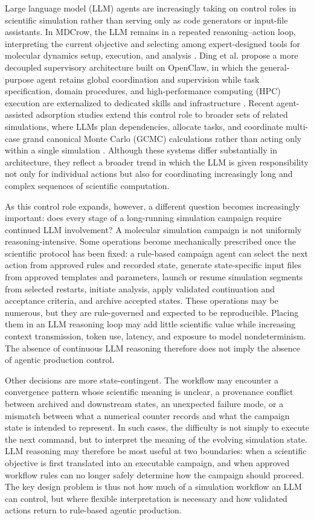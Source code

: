 Large language model (LLM) agents are increasingly taking on control roles in scientific simulation rather than serving only as code generators or input-file assistants. In MDCrow, the LLM remains in a repeated reasoning--action loop, interpreting the current objective and selecting among expert-designed tools for molecular dynamics setup, execution, and analysis \cite{mdcrow}. Ding et al. propose a more decoupled supervisory architecture built on OpenClaw, in which the general-purpose agent retains global coordination and supervision while task specification, domain procedures, and high-performance computing (HPC) execution are externalized to dedicated skills and infrastructure \cite{openclawchem}. Recent agent-assisted adsorption studies extend this control role to broader sets of related simulations, where LLMs plan dependencies, allocate tasks, and coordinate multi-case grand canonical Monte Carlo (GCMC) calculations rather than acting only within a single simulation \cite{simmof,multiagentgcmc}. Although these systems differ substantially in architecture, they reflect a broader trend in which the LLM is given responsibility not only for individual actions but also for coordinating increasingly long and complex sequences of scientific computation.

As this control role expands, however, a different question becomes increasingly important: does every stage of a long-running simulation campaign require continued LLM involvement? A molecular simulation campaign is not uniformly reasoning-intensive. Some operations become mechanically prescribed once the scientific protocol has been fixed: a rule-based campaign agent can select the next action from approved rules and recorded state, generate state-specific input files from approved templates and parameters, launch or resume simulation segments from selected restarts, initiate analysis, apply validated continuation and acceptance criteria, and archive accepted states. These operations may be numerous, but they are rule-governed and expected to be reproducible. Placing them in an LLM reasoning loop may add little scientific value while increasing context transmission, token use, latency, and exposure to model nondeterminism. The absence of continuous LLM reasoning therefore does not imply the absence of agentic production control.

Other decisions are more state-contingent. The workflow may encounter a convergence pattern whose scientific meaning is unclear, a provenance conflict between archived and downstream states, an unexpected failure mode, or a mismatch between what a numerical counter records and what the campaign state is intended to represent. In such cases, the difficulty is not simply to execute the next command, but to interpret the meaning of the evolving simulation state. LLM reasoning may therefore be most useful at two boundaries: when a scientific objective is first translated into an executable campaign, and when approved workflow rules can no longer safely determine how the campaign should proceed. The key design problem is thus not how much of a simulation workflow an LLM can control, but where flexible interpretation is necessary and how validated actions return to rule-based agentic production.


